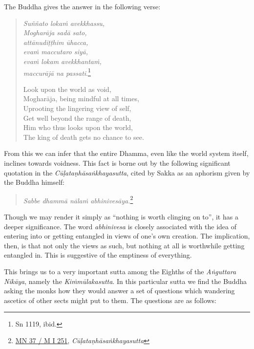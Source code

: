 The Buddha gives the answer in the following verse:

\begin{quote}
\emph{Suññato lokaṁ avekkhassu,}\\
\emph{Mogharāja sadā sato,}\\
\emph{attānudiṭṭhim ūhacca,}\\
\emph{evaṁ maccutaro siyā,}\\
\emph{evaṁ lokam avekkhantaṁ,}\\
\emph{maccurājā na passati}.\footnote{Sn 1119, ibid.}

Look upon the world as void,\\
Mogharāja, being mindful at all times,\\
Uprooting the lingering view of self,\\
Get well beyond the range of death,\\
Him who thus looks upon the world,\\
The king of death gets no chance to see.
\end{quote}

From this we can infer that the entire Dhamma, even like the world system itself, inclines towards voidness. This fact is borne out by the following significant quotation in the \emph{Cūḷataṇhāsaṅkhayasutta}, cited by Sakka as an aphorism given by the Buddha himself:

\begin{quote}
\emph{Sabbe dhammā nālaṁ abhinivesāya.}\footnote{\href{https://suttacentral.net/mn37/pli/ms}{MN 37 / M I 251}, \emph{Cūḷataṇhāsaṅkhayasutta}}
\end{quote}

Though we may render it simply as ``nothing is worth clinging on to'', it has a deeper significance. The word \emph{abhinivesa} is closely associated with the idea of entering into or getting entangled in views of one's own creation. The implication, then, is that not only the views as such, but nothing at all is worthwhile getting entangled in. This is suggestive of the emptiness of everything.

This brings us to a very important sutta among the Eighths of the \emph{Aṅguttara Nikāya}, namely the \emph{Kiṁmūlakasutta}. In this particular sutta we find the Buddha asking the monks how they would answer a set of questions which wandering ascetics of other sects might put to them. The questions are as follows:

